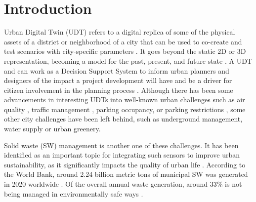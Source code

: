 \documentclass[authoryear,preprint,review,11pt,doubleblind]{elsarticle}
\begin{document}

    \section{Introduction}
    \label{sec:Intro}
    Urban Digital Twin (UDT) refers to a digital replica of some of the physical assets of a district or neighborhood of a city that can be used to co-create and test scenarios with city-specific parameters \citep{Ruohomaki2018}. It goes beyond the static 2D or 3D representation, becoming a model for the past, present, and future state \citep{geohubDigitalTwinningUrban2022}. %
    A UDT %
    and can work as a Decision Support System to inform urban planners and designers of the impact a project development will have and be a driver for citizen involvement in the planning process \citep{Dembski2019, Dembski2020}. Although there has been some advancements in interesting UDTs into  well-known urban challenges such as air quality \citep{Mak2021}, traffic management \citep{Ibrahim2022}, parking occupancy, or parking restrictions \citep{latreCityThingsIntegrated2016}, some other city challenges have been left behind, such as underground management, water supply or urban greenery.


    Solid waste (SW) management is another one of these challenges. It has been identified as an important topic for integrating such sensors to improve urban sustainability, as it significantly impacts the quality of urban life \citep{Ismagilova2019}. According to the World Bank, around 2.24 billion metric tons of municipal SW was generated in 2020 worldwide \citep{Kaza2021}.%
    Of the overall annual waste generation, around 33\% is not being managed in environmentally safe ways \citep{Kaza2018}. 
\end{document}
